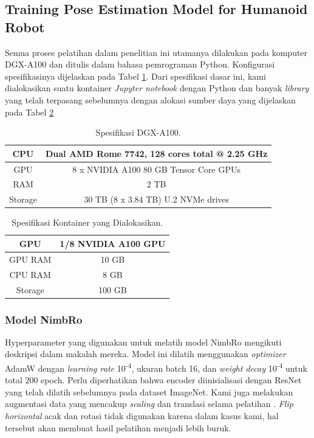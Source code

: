 \subsection{Training Pose Estimation Model for Humanoid Robot}
\label{subsec:training-robot}

Semua proses pelatihan dalam penelitian ini utamanya dilakukan pada komputer DGX-A100 dan ditulis dalam bahasa pemrograman Python. Konfigurasi spesifikasinya dijelaskan pada Tabel \ref{tb:dgxa100}.
Dari spesifikasi dasar ini, kami dialokasikan suatu kontainer \textit{Jupyter notebook} dengan Python dan banyak \textit{library} yang telah terpasang sebelumnya dengan alokasi sumber daya yang dijelaskan pada Tabel \ref{tb:allocatedcontainer}
\begin{longtable}{|c|c|}
  \caption{Spesifikasi DGX-A100.}
  \label{tb:dgxa100}\\
  \hline
  CPU     & Dual AMD Rome 7742, 128 cores total @ 2.25 GHz \\
  \hline
  GPU     & 8 x NVIDIA A100 80 GB Tensor Core GPUs  \\
  \hline
  RAM     & 2 TB \\
  \hline
  Storage & 30 TB (8 x 3.84 TB) U.2 NVMe drives \\
  \hline
\end{longtable}

\begin{longtable}{|c|c|}
  \caption{Spesifikasi Kontainer yang Dialokasikan.}
  \label{tb:allocatedcontainer}\\
  \hline
  GPU     & 1/8 NVIDIA A100 GPU \\
  \hline
  GPU RAM & 10 GB  \\
  \hline
  CPU RAM & 8 GB \\
  \hline
  Storage & 100 GB  \\
  \hline
\end{longtable}

\subsubsection{Model NimbRo}
\label{subsubsec:training-nimbro-model}

Hyperparameter yang digunakan untuk melatih model NimbRo mengikuti deskripsi dalam makalah mereka.
Model ini dilatih menggunakan \textit{optimizer} AdamW dengan \textit{learning rate} 10\textsuperscript{-4},
ukuran batch 16, dan \textit{weight decay} 10\textsuperscript{-4} untuk total 200 epoch.
Perlu diperhatikan bahwa encoder diinisialisasi dengan ResNet yang telah dilatih sebelumnya pada dataset ImageNet.
Kami juga melakukan augmentasi data yang mencakup \textit{scaling} dan translasi selama pelatihan \parencite{amini2021}.
\textit{Flip horizontal} acak dan rotasi tidak digunakan karena dalam kasus kami, hal tersebut akan membuat hasil pelatihan menjadi lebih buruk.

